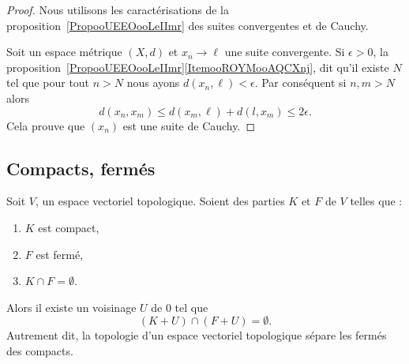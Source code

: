 \begin{proof}
	Nous utilisons les caractérisations de la proposition~\ref{PropooUEEOooLeIImr} des suites convergentes et de Cauchy.

	Soit un espace métrique \( (X,d)\) et \( x_n\to\ell\) une suite convergente. Si \( \epsilon>0\), la proposition~\ref{PropooUEEOooLeIImr}\ref{ItemooROYMooAQCXnj}, dit qu'il existe \( N\) tel que pour tout \( n>N\) nous ayons \( d(x_n,\ell)<\epsilon\). Par conséquent si \( n,m>N\) alors
	\begin{equation}
		d(x_n,x_m)\leq d(x_m,\ell)+d(l,x_m)\leq 2\epsilon.
	\end{equation}
	Cela prouve que \( (x_n)\) est une suite de Cauchy.
\end{proof}

\subsection{Compacts, fermés}

\begin{proposition}     \label{PROPooRMAOooZIgXwy}
	Soit \( V\), un espace vectoriel topologique. Soient des parties \( K\) et \( F\) de \( V\) telles que :
	\begin{enumerate}
		\item
		      \( K\) est compact,
		\item
		      \( F\) est fermé,
		\item
		      \( K\cap F=\emptyset\).
	\end{enumerate}
	Alors il existe un voisinage \( U\) de \( 0\) tel que
	\begin{equation}
		(K+U)\cap (F+U)=\emptyset.
	\end{equation}
	Autrement dit, la topologie d'un espace vectoriel topologique sépare les fermés des compacts.
\end{proposition}

